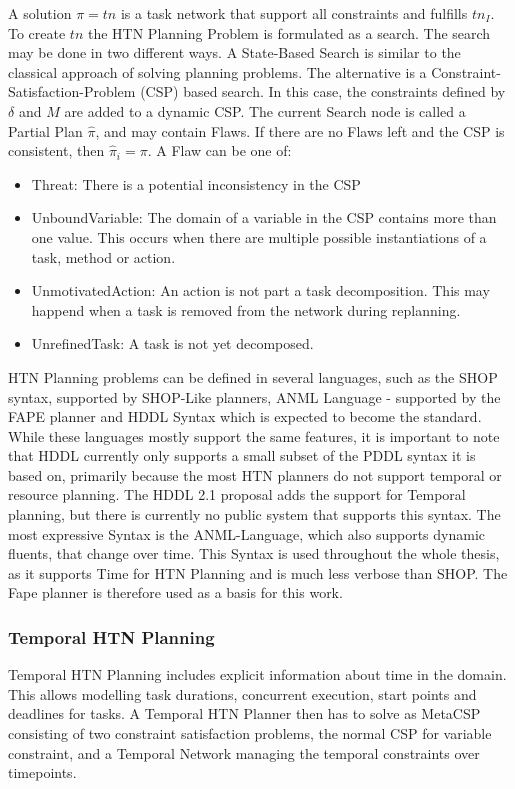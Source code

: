 A solution $\pi = tn$ is a task network that support all constraints and fulfills $tn_I$.
To create $tn$ the HTN Planning Problem is formulated as a search.
The search may be done in two different ways.
A State-Based Search is similar to the classical approach of solving planning problems.
The alternative is a Constraint-Satisfaction-Problem (CSP) based search.
In this case, the constraints defined by $\delta$ and $M$ are added to a dynamic CSP.
The current Search node is called a Partial Plan $\hat{\pi}$, and may contain Flaws.
If there are no Flaws left and the CSP is consistent, then $\hat{\pi}_i = \pi$.
A Flaw can be one of:
\begin{itemize}
  \item Threat: There is a potential inconsistency in the CSP
  \item UnboundVariable: The domain of a variable in the CSP contains more than one value. This occurs when there are multiple possible instantiations of a task, method or action.
  \item UnmotivatedAction: An action is not part a task decomposition. This may happend when a task is removed from the network during replanning.
  \item UnrefinedTask: A task is not yet decomposed.
\end{itemize}

HTN Planning problems can be defined in several languages, such as the SHOP syntax, supported by SHOP-Like planners, ANML Language - supported by the FAPE planner and HDDL Syntax which is expected to become the standard.
While these languages mostly support the same features, it is important to note that HDDL currently only supports a small subset of the PDDL syntax it is based on, primarily because the most HTN planners do not support temporal or resource planning.
The HDDL 2.1 proposal adds the support for Temporal planning, but there is currently no public system that supports this syntax.
The most expressive Syntax is the ANML-Language, which also supports dynamic fluents, that change over time.
This Syntax is used throughout the whole thesis, as it supports Time for HTN Planning and is much less verbose than SHOP.
The Fape planner is therefore used as a basis for this work.

\subsubsection{Temporal HTN Planning}\label{sec:temporal-htn-planning}

Temporal HTN Planning includes explicit information about time in the domain.
This allows modelling task durations, concurrent execution, start points and deadlines for tasks.
A Temporal HTN Planner then has to solve as MetaCSP consisting of two constraint satisfaction problems, the normal CSP for variable constraint, and a Temporal Network managing the temporal constraints over timepoints. 

